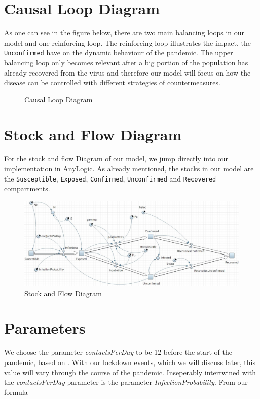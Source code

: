 \documentclass
[
    report,
    11pt,
    bibliography = totoc,
    listof = totoc,
    headinclude = true,
]
{scrreport}
\begin{document}
\section{Causal Loop Diagram}

As one can see in the figure below, there are two main balancing loops
in our model and one reinforcing loop. The reinforcing loop illustrates the impact, the \texttt{Unconfirmed} have on the dynamic behaviour of the pandemic. The upper balancing loop only
becomes relevant after a big portion of the population has already recovered
from the virus and therefore our model will focus on how the disease can
be controlled with different strategies of countermeasures.

\begin{figure}[hbt!]
  
  \caption{Causal Loop Diagram}
\end{figure}

\section{Stock and Flow Diagram}

For the stock and flow Diagram of our model, we jump directly into
our implementation in AnyLogic. As already mentioned, the stocks in our model
are the \texttt{Susceptible}, \texttt{Exposed}, \texttt{Confirmed}, \texttt{Unconfirmed} and \texttt{Recovered} compartments.

\begin{figure}[hbt!]
  \includegraphics[width=\linewidth]{../AnyLogicSIR.JPG}
  \caption{Stock and Flow Diagram}
\end{figure}

\FloatBarrier

\section{Parameters}

We choose the parameter \textit{contactsPerDay} to be 12 before the start of the pandemic,
based on \cite{Spiegel}. With our lockdown events, which we will discuss
later, this value will vary through the course of the pandemic.
Inseperably intertwined with the \textit{contactsPerDay} parameter is the parameter \textit{InfectionProbability}. From our formula
\end{document}
